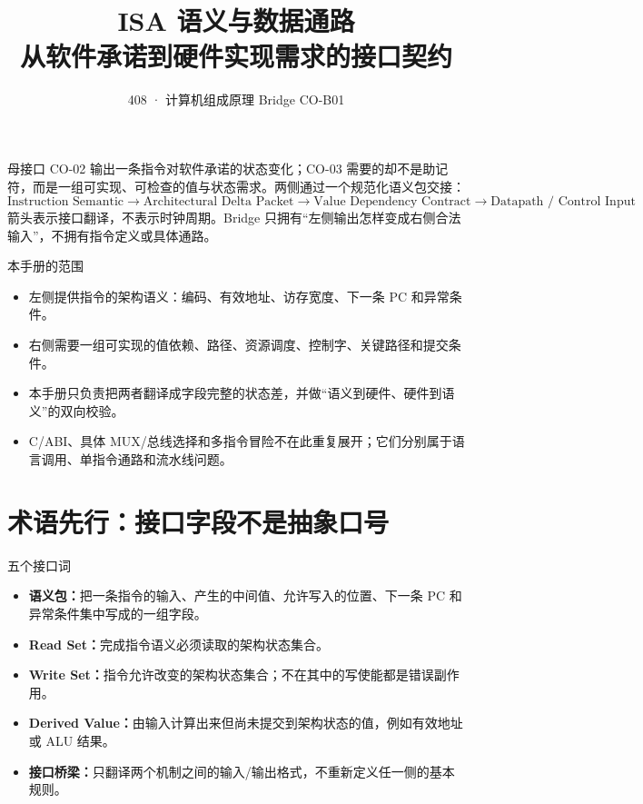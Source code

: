 \documentclass[UTF8,fontset=fandol,11pt,a4paper]{ctexart}
\title{\vspace{-1.1cm}\textbf{ISA 语义与数据通路}\\[0.4em]
\large 从软件承诺到硬件实现需求的接口契约}
\author{408 · 计算机组成原理 Bridge CO-B01}
\date{}
\newcommand{\kw}[1]{\textbf{\color{deep}#1}}
\begin{document}
\maketitle

\begin{corebox}{母接口}
CO-02 输出一条指令对软件承诺的状态变化；CO-03 需要的却不是助记符，而是一组可实现、可检查的值与状态需求。两侧通过一个规范化语义包交接：
\[
\boxed{
\text{Instruction Semantic}
\to\text{Architectural Delta Packet}
\to\text{Value Dependency Contract}
\to\text{Datapath / Control Input}}
\]
箭头表示接口翻译，不表示时钟周期。Bridge 只拥有“左侧输出怎样变成右侧合法输入”，不拥有指令定义或具体通路。
\end{corebox}

\begin{methodbox}{本手册的范围}
\begin{itemize}
  \item 左侧提供指令的架构语义：编码、有效地址、访存宽度、下一条 PC 和异常条件。
  \item 右侧需要一组可实现的值依赖、路径、资源调度、控制字、关键路径和提交条件。
  \item 本手册只负责把两者翻译成字段完整的状态差，并做“语义到硬件、硬件到语义”的双向校验。
  \item C/ABI、具体 MUX/总线选择和多指令冒险不在此重复展开；它们分别属于语言调用、单指令通路和流水线问题。
\end{itemize}
\end{methodbox}

\section{术语先行：接口字段不是抽象口号}
\begin{methodbox}{五个接口词}
\begin{itemize}
  \item \kw{语义包：}把一条指令的输入、产生的中间值、允许写入的位置、下一条 PC 和异常条件集中写成的一组字段。
  \item \kw{Read Set：}完成指令语义必须读取的架构状态集合。
  \item \kw{Write Set：}指令允许改变的架构状态集合；不在其中的写使能都是错误副作用。
  \item \kw{Derived Value：}由输入计算出来但尚未提交到架构状态的值，例如有效地址或 ALU 结果。
  \item \kw{接口桥梁：}只翻译两个机制之间的输入/输出格式，不重新定义任一侧的基本规则。
\end{itemize}
\end{methodbox}
\end{document}
